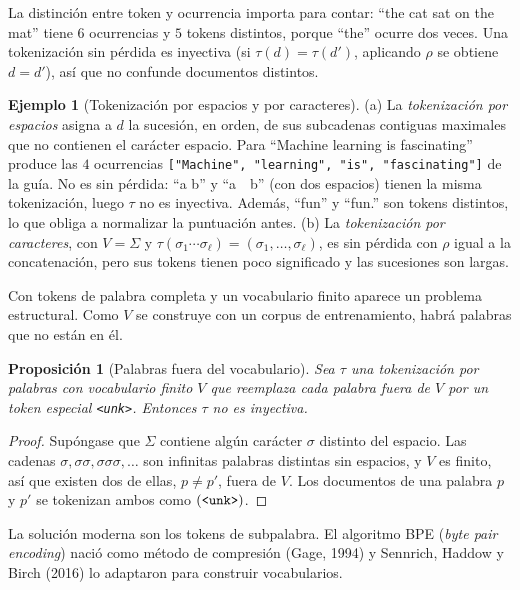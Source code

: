 \documentclass[11pt]{article}
\newtheorem{proposicion}[teorema]{Proposición}
\theoremstyle{definition}
\newtheorem{ejemplo}[teorema]{Ejemplo}
\theoremstyle{remark}
\begin{document}
\noindent La distinción entre token y ocurrencia importa para contar: ``the cat sat on the mat'' tiene $6$ ocurrencias y $5$ tokens distintos, porque ``the'' ocurre dos veces. Una tokenización sin pérdida es inyectiva (si $\tau(d)=\tau(d')$, aplicando $\rho$ se obtiene $d=d'$), así que no confunde documentos distintos.

\begin{ejemplo}[Tokenización por espacios y por caracteres]\label{ej:tokenizadores}
\noindent (a) La \emph{tokenización por espacios} asigna a $d$ la sucesión, en orden, de sus subcadenas contiguas maximales que no contienen el carácter espacio. Para ``Machine learning is fascinating'' produce las $4$ ocurrencias \texttt{["Machine", "learning", "is", "fascinating"]} de la guía. No es sin pérdida: ``a b'' y ``a\ \ b'' (con dos espacios) tienen la misma tokenización, luego $\tau$ no es inyectiva. Además, ``fun'' y ``fun.'' son tokens distintos, lo que obliga a normalizar la puntuación antes. (b) La \emph{tokenización por caracteres}, con $V=\Sigma$ y $\tau(\sigma_1\cdots\sigma_\ell)=(\sigma_1,\dots,\sigma_\ell)$, es sin pérdida con $\rho$ igual a la concatenación, pero sus tokens tienen poco significado y las sucesiones son largas.
\end{ejemplo}

\noindent Con tokens de palabra completa y un vocabulario finito aparece un problema estructural. Como $V$ se construye con un corpus de entrenamiento, habrá palabras que no están en él.

\begin{proposicion}[Palabras fuera del vocabulario]\label{prop:oov}
\noindent Sea $\tau$ una tokenización por palabras con vocabulario finito $V$ que reemplaza cada palabra fuera de $V$ por un token especial \texttt{\textless unk\textgreater}. Entonces $\tau$ no es inyectiva.
\end{proposicion}
\begin{proof}
\noindent Supóngase que $\Sigma$ contiene algún carácter $\sigma$ distinto del espacio. Las cadenas $\sigma,\sigma\sigma,\sigma\sigma\sigma,\dots$ son infinitas palabras distintas sin espacios, y $V$ es finito, así que existen dos de ellas, $p\ne p'$, fuera de $V$. Los documentos de una palabra $p$ y $p'$ se tokenizan ambos como $(\texttt{\textless unk\textgreater})$.
\end{proof}

\noindent La solución moderna son los tokens de subpalabra. El algoritmo BPE (\emph{byte pair encoding}) nació como método de compresión (Gage, 1994) y Sennrich, Haddow y Birch (2016) lo adaptaron para construir vocabularios.
\end{document}
